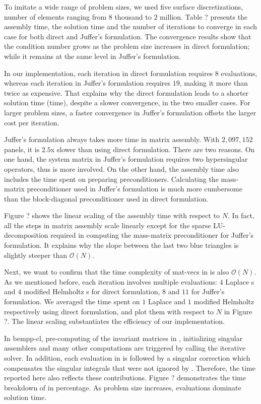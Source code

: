 To imitate a wide range of problem sizes, we used five surface discretizations, number of elements ranging from $8$ thousand to $2$ million.
Table ? presents the assembly time, the solution time and the number of iterations to converge in each case for both direct and Juffer's formulation.
The convergence results show that the condition number grows as the problem size increases in direct formulation; while it remains at the same level in Juffer's formulation.

In our implementation, each iteration in direct formulation requires $8$ \fmm evaluations, whereas each iteration in Juffer's formulation requires $19$, making it more than twice as expensive.
That explains why the direct formulation leads to a shorter solution time (\gmres time), despite a slower convergence, in the two smaller cases.
For larger problem sizes, a faster convergence in Juffer's formulation offsets the larger cost per iteration.

Juffer's formulation always takes more time in matrix assembly.
With $2,097,152$ panels, it is $2.5$x slower than using direct formulation.
There are two reasons.
On one hand, the system matrix in Juffer's formulation requires two hypersingular operators, thus is more involved.
On the other hand, the assembly time also includes the time spent on preparing preconditioners.
Calculating the mass-matrix preconditioner used in Juffer's formulation is much more cumbersome than the block-diagonal preconditioner used in direct formulation.

Figure ? shows the linear scaling of the assembly time with respect to $N$.
In fact, all the steps in matrix assembly scale linearly except for the sparse LU-decomposition required in computing the mass-matrix preconditioner for Juffer's formulation.
It explains why the slope between the last two blue triangles is slightly steeper than $\mathcal{O}(N)$.

Next, we want to confirm that the time complexity of mat-vecs in \gmres is also $\mathcal{O}(N)$.
As we mentioned before, each iteration involves multiple \fmm evaluations: $4$ Laplace {\fmm}s and $4$ modified Helmholtz {\fmm}s for direct formulation, $8$ and $11$ for Juffer's formulation.
We averaged the time spent on $1$ Laplace \fmm and $1$ modified Helmholtz \fmm respectively using direct formulation, and plot them with respect to $N$ in Figure ?.
The linear scaling substantiates the efficiency of our \fmm implementation.

In bempp-cl, pre-computing of the invariant matrices in \fmm, initializing singular assemblers and many other computations are triggered by calling the iterative solver.
In addition, each \fmm evaluation in \gmres is followed by a singular correction which compensates the singular integrals that were not ignored by \fmm.
Therefore, the \gmres time reported here also reflects these contributions.
Figure ? demonstrates the time breakdown of \gmres in percentage.
As problem size increases, \fmm evaluations dominate solution time.

